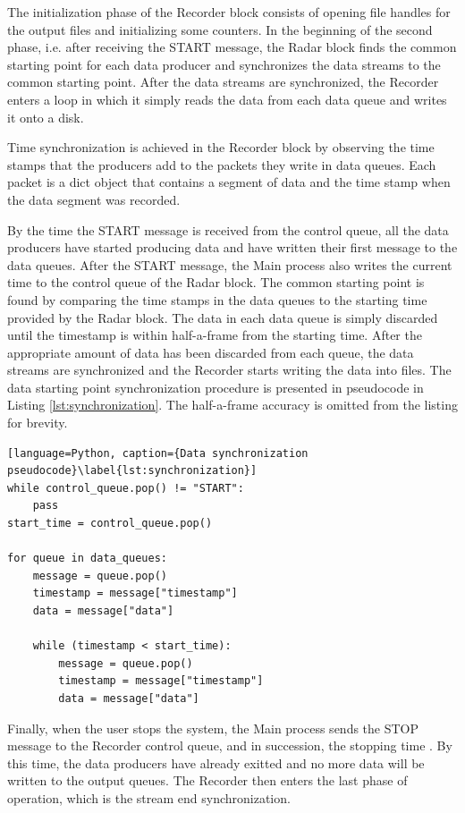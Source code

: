 The initialization phase of the Recorder block consists of opening file handles for the output files and initializing some counters.
In the beginning of the second phase, i.e. after receiving the START message,
the Radar block finds the common starting point for each data producer and synchronizes the data streams to the common starting point.
After the data streams are synchronized, the Recorder enters a loop in which it simply reads the data from each data queue and writes it onto a disk.

Time synchronization is achieved in the Recorder block by observing the time stamps that the producers add to the packets they write in data queues.
Each packet is a dict object that contains a segment of data and the time stamp when the data segment was recorded.

By the time the START message is received from the control queue,
all the data producers have started producing data and have written their first message to the data queues.
After the START message, the Main process also writes the current time to the control queue of the Radar block.
The common starting point is found by comparing the time stamps in the data queues to the starting time provided by the Radar block.
The data in each data queue is simply discarded until the timestamp is within half-a-frame from the starting time.
After the appropriate amount of data has been discarded from each queue,
the data streams are synchronized and the Recorder starts writing the data into files.
The data starting point synchronization procedure is presented in pseudocode in Listing \ref{lst:synchronization}.
The half-a-frame accuracy is omitted from the listing for brevity.

\begin{lstlisting}[language=Python, caption={Data synchronization pseudocode}\label{lst:synchronization}]
while control_queue.pop() != "START":
    pass
start_time = control_queue.pop()

for queue in data_queues:
    message = queue.pop()
    timestamp = message["timestamp"]
    data = message["data"]
    
    while (timestamp < start_time):
        message = queue.pop()
        timestamp = message["timestamp"]
        data = message["data"]
\end{lstlisting}

Finally, when the user stops the system, the Main process sends the STOP message to the Recorder control queue,
and in succession, the stopping time .
By this time, the data producers have already exitted and no more data will be written to the output queues.
The Recorder then enters the last phase of operation,
which is the stream end synchronization.

